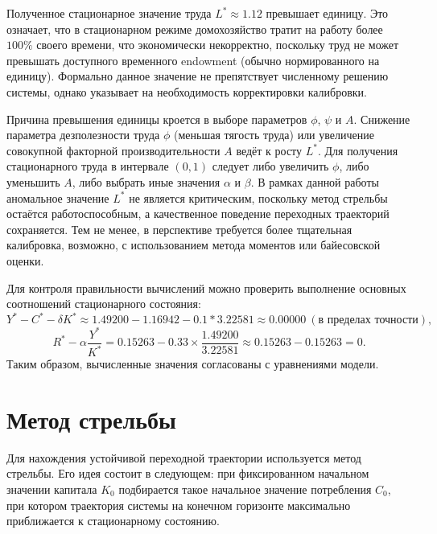 \documentclass[12pt,a4paper]{report}   %
\begin{document}
            Полученное стационарное значение труда $L^* \approx 1.12$ превышает единицу. Это означает, что в стационарном режиме домохозяйство тратит на работу более $100\%$ своего времени, что экономически некорректно, поскольку труд не может превышать доступного временного endowment (обычно нормированного на единицу). Формально данное значение не препятствует численному решению системы, однако указывает на необходимость корректировки калибровки.

            Причина превышения единицы кроется в выборе параметров $\phi$, $\psi$ и $A$. Снижение параметра дезполезности труда $\phi$ (меньшая тягость труда) или увеличение совокупной факторной производительности $A$ ведёт к росту $L^*$. Для получения стационарного труда в интервале $(0, 1)$ следует либо увеличить $\phi$, либо уменьшить $A$, либо выбрать иные значения $\alpha$ и $\beta$. В рамках данной работы аномальное значение $L^*$ не является критическим, поскольку метод стрельбы остаётся работоспособным, а качественное поведение переходных траекторий сохраняется. Тем не менее, в перспективе требуется более тщательная калибровка, возможно, с использованием метода моментов или байесовской оценки.

            Для контроля правильности вычислений можно проверить выполнение основных соотношений стационарного состояния:
            \[
            Y^* - C^* - \delta K^* \approx 1.49200 - 1.16942 - 0.1*3.22581 \approx 0.00000 \ (\text{в пределах точности}),
            \]
            \[
            R^* - \alpha\frac{Y^*}{K^*} = 0.15263 - 0.33 \times \frac{1.49200}{3.22581} \approx 0.15263 - 0.15263 = 0.
            \]
            Таким образом, вычисленные значения согласованы с уравнениями модели.
        
    \chapter{Метод стрельбы}
        
        Для нахождения устойчивой переходной траектории используется метод стрельбы. Его идея состоит в следующем: при фиксированном начальном значении капитала $K_0$ подбирается такое начальное значение потребления $C_0$, при котором траектория системы на конечном горизонте максимально приближается к стационарному состоянию.
\end{document}
